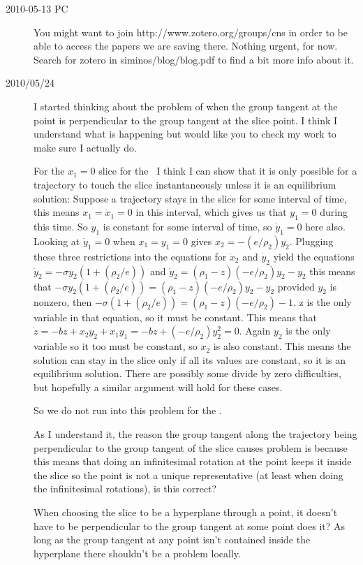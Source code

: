 \begin{description}
\item[2010-05-13 PC] You might want to join
{http://www.zotero.org/groups/cns}
in order to be able to access the papers we are saving there. Nothing
urgent, for now. Search for zotero in siminos/blog/blog.pdf to find
a bit more info about it.

\item[2010/05/24] I started thinking about the problem of when the group tangent at the point is perpendicular to the group tangent at the slice point. I think I understand what is happening but would like you to check my work to make sure I actually do.

    For the $x_1 = 0$ slice for the \cLe\ I think I can show that it is only possible for a trajectory to touch the slice instantaneously unless it is an equilibrium solution: Suppose a trajectory stays in the slice for some interval of time, this means $x_1 = \dot x_1 = 0$ in this interval, which gives us that $y_1 = 0$ during this time. So $y_1$ is constant for some interval of time, so $\dot y_1=0$ here also. Looking at $\dot y_1 = 0$ when $x_1=y_1 =0$ gives $x_2 = -(e/\rho_2)y_2$. Plugging these three restrictions into the equations for $\dot x_2$ and $\dot y_2$ yield the equations $\dot y_2=-\sigma y_2 (1+(\rho_2 / e))$ and $\dot y_2 = (\rho_1 - z)(-e/\rho_2)y_2-y_2$ this means that $-\sigma y_2 (1+(\rho_2 / e))=(\rho_1 - z)(-e/\rho_2)y_2-y_2$ provided $y_2$ is nonzero, then $-\sigma (1+(\rho_2 / e))=(\rho_1-z)(-e/\rho_2)-1$. z is the only variable in that equation, so it must be constant. This means that $\dot z = -b z + x_2 y_2 + x_1 y_1=-b z+ (-e/\rho_2)y_2^2=0$. Again $y_2$ is the only variable so it too must be constant, so $x_2$ is also constant. This means the solution can stay in the slice only if all its values are constant, so it is an equilibrium solution. There are possibly some divide by zero difficulties, but hopefully a similar argument will hold for these cases.

    So we do not run into this problem for the \cLf.

    As I understand it, the reason the group tangent along the trajectory being perpendicular to the group tangent of the slice causes problem is because this means that doing an infinitesimal rotation at the point keeps it inside the slice so the point is not a unique representative (at least when doing the infinitesimal rotations), is this correct?

    When choosing the slice to be a hyperplane through a point, it doesn't have to be perpendicular to the group tangent at some point does it? As long as the group tangent at any point isn't contained inside the hyperplane there shouldn't be a problem locally.


\end{description}
